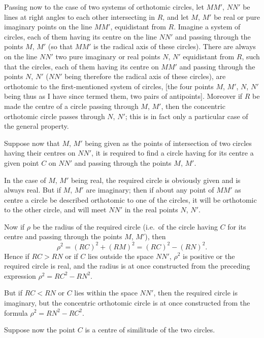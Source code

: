 \documentclass[12pt,a4paper]{article}
\theoremstyle{plain}
\theoremstyle{definition}
\begin{document}
\newpage
[183]

Passing now to the case of two systems of orthotomic circles, let $MM'$, $NN'$ be lines at right angles to each other intersecting in $R$, and let $M$, $M'$ be real or pure imaginary points on the line $MM'$, equidistant from $R$. Imagine a system of circles, each of them having its centre on the line $NN'$ and passing through the points $M$, $M'$ (so that $MM'$ is the radical axis of these circles). There are always on the line $NN'$ two pure imaginary or real points $N$, $N'$ equidistant from $R$, such that the circles, each of them having its centre on $MM'$ and passing through the points $N$, $N'$ ($NN'$ being therefore the radical axis of these circles), are orthotomic to the first-mentioned system of circles, [the four points $M$, $M'$, $N$, $N'$ being thus as I have since termed them, two pairs of antipoints]. Moreover if $R$ be made the centre of a circle passing through $M$, $M'$, then the concentric orthotomic circle passes through $N$, $N'$; this is in fact only a particular case of the general property.

Suppose now that $M$, $M'$ being given as the points of intersection of two circles having their centres on $NN'$, it is required to find a circle having for its centre a given point $C$ on $NN'$ and passing through the points $M$, $M'$.

In the case of $M$, $M'$ being real, the required circle is obviously given and is always real. But if $M$, $M'$ are imaginary; then if about any point of $MM'$ as centre a circle be described orthotomic to one of the circles, it will be orthotomic to the other circle, and will meet $NN'$ in the real points $N$, $N'$.

Now if $\rho$ be the radius of the required circle (i.e.\ of the circle having $C$ for its centre and passing through the points $M$, $M'$), then
\[
\rho^2 = (RC)^2 + (RM)^2 = (RC)^2 - (RN)^2.
\]
Hence if $RC > RN$ or if $C$ lies outside the space $NN'$, $\rho^2$ is positive or the required circle is real, and the radius is at once constructed from the preceding expression $\rho^2 = RC^2 - RN^2$.

But if $RC < RN$ or $C$ lies within the space $NN'$, then the required circle is imaginary, but the concentric orthotomic circle is at once constructed from the formula $\rho^2 = RN^2 - RC^2$.

\newpage
[183]

Suppose now the point $C$ is a centre of similitude of the two circles.
\end{document}
